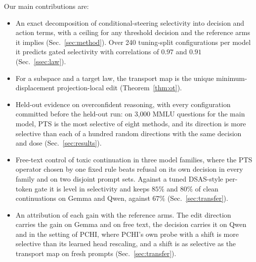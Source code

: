 \documentclass{article}
\begin{document}
Our main contributions are:
\begin{itemize}\setlength{\itemsep}{1pt}
\item An exact decomposition of conditional-steering selectivity into
decision and action terms, with a ceiling for any threshold decision and the
reference arms it implies (Sec.~\ref{sec:method}). Over 240 tuning-split
configurations per model it predicts gated selectivity with correlations of
$0.97$ and $0.91$ (Sec.~\ref{ssec:law}).
\item For a subspace and a target law, the transport map is the unique
minimum-displacement projection-local edit (Theorem~\ref{thm:ot}).
\item Held-out evidence on overconfident reasoning, with every configuration
committed before the held-out run: on 3{,}000 MMLU questions for the main model,
PTS is the most selective of eight methods, and its direction is more selective
than each of a hundred random directions with the same decision and dose
(Sec.~\ref{sec:results}).
\item Free-text control of toxic continuation in three model families, where
the PTS operator chosen by one fixed rule beats refusal on its own decision in
every family and on two disjoint prompt sets. Against a tuned DSAS-style
per-token gate it is level in selectivity and keeps $85\%$ and $80\%$ of clean
continuations on Gemma and Qwen, against $67\%$ (Sec.~\ref{sec:transfer}).
\item An attribution of each gain with the reference arms. The edit direction
carries the gain on Gemma and on free text, the decision carries it on Qwen
and in the setting of PCHI, where PCHI's own probe with a shift is more
selective than its learned head rescaling, and a shift is as selective as the
transport map on fresh prompts (Sec.~\ref{sec:transfer}).
\end{itemize}
\end{document}
